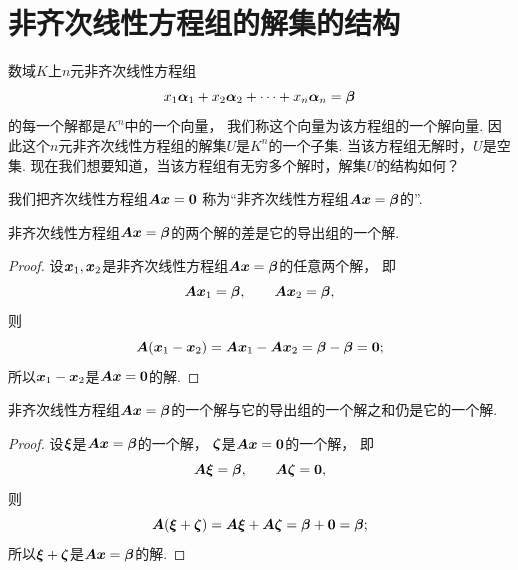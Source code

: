 \section{非齐次线性方程组的解集的结构}
数域\(K\)上\(n\)元非齐次线性方程组
\begin{equation}\label{equation:向量空间.非齐次线性方程组}
	x_1\boldsymbol\alpha_1+x_2\boldsymbol\alpha_2+\dotsb+x_n\boldsymbol\alpha_n=\boldsymbol\beta
\end{equation}
的每一个解都是\(K^n\)中的一个向量，
我们称这个向量为该方程组的一个解向量.
因此这个\(n\)元非齐次线性方程组的解集\(U\)是\(K^n\)的一个子集.
当该方程组无解时，\(U\)是空集.
现在我们想要知道，当该方程组有无穷多个解时，解集\(U\)的结构如何？

我们把齐次线性方程组\(\boldsymbol{A} \boldsymbol{x} = \boldsymbol0\)
称为“非齐次线性方程组\(\boldsymbol{A} \boldsymbol{x} = \boldsymbol\beta\)的”.

\begin{proposition}\label{theorem:非齐次线性方程组的解集的结构.解集的结构1}
非齐次线性方程组\(\boldsymbol{A} \boldsymbol{x} = \boldsymbol\beta\)的两个解的差是它的导出组的一个解.
\begin{proof}
设\(\boldsymbol{x}_1,\boldsymbol{x}_2\)是非齐次线性方程组\(\boldsymbol{A} \boldsymbol{x} = \boldsymbol\beta\)的任意两个解，
即\begin{equation*}
	\boldsymbol{A} \boldsymbol{x}_1 = \boldsymbol\beta,
	\qquad
	\boldsymbol{A} \boldsymbol{x}_2 = \boldsymbol\beta,
\end{equation*}
则\begin{equation*}
	\boldsymbol{A}(\boldsymbol{x}_1 - \boldsymbol{x}_2)
	= \boldsymbol{A} \boldsymbol{x}_1 - \boldsymbol{A} \boldsymbol{x}_2
	= \boldsymbol\beta - \boldsymbol\beta
	= \boldsymbol0;
\end{equation*}
所以\(\boldsymbol{x}_1 - \boldsymbol{x}_2\)是\(\boldsymbol{A} \boldsymbol{x} = \boldsymbol0\)的解.
\end{proof}
\end{proposition}

\begin{proposition}\label{theorem:非齐次线性方程组的解集的结构.解集的结构2}
非齐次线性方程组\(\boldsymbol{A} \boldsymbol{x} = \boldsymbol\beta\)的一个解与它的导出组的一个解之和仍是它的一个解.
\begin{proof}
设\(\boldsymbol\xi\)是\(\boldsymbol{A} \boldsymbol{x} = \boldsymbol\beta\)的一个解，
\(\boldsymbol\zeta\)是\(\boldsymbol{A} \boldsymbol{x} = \boldsymbol0\)的一个解，
即\begin{equation*}
	\boldsymbol{A}\boldsymbol\xi = \boldsymbol\beta,
	\qquad
	\boldsymbol{A}\boldsymbol\zeta = \boldsymbol0,
\end{equation*}
则\begin{equation*}
	\boldsymbol{A}(\boldsymbol\xi + \boldsymbol\zeta)
	= \boldsymbol{A}\boldsymbol\xi + \boldsymbol{A}\boldsymbol\zeta
	= \boldsymbol\beta + \boldsymbol0
	= \boldsymbol\beta;
\end{equation*}
所以\(\boldsymbol\xi + \boldsymbol\zeta\)是\(\boldsymbol{A} \boldsymbol{x} = \boldsymbol\beta\)的解.
\end{proof}
\end{proposition}

